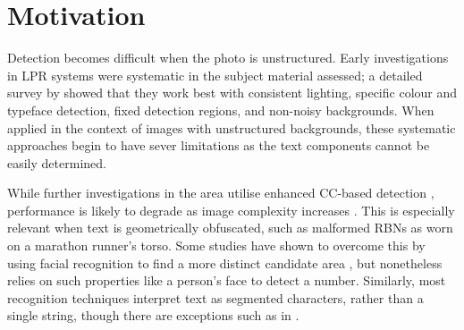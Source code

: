 \section{Motivation}
\label{sec:motivation}

Detection becomes difficult when the photo is unstructured. Early investigations in LPR systems were systematic in the subject material assessed; a detailed survey by \cite{Anagnostopoulos:2008vu} showed that they work best  with consistent lighting, specific colour and typeface detection, fixed detection regions, and non-noisy backgrounds. When applied in the context of images with unstructured backgrounds, these systematic approaches begin to have sever limitations as the text components cannot be easily determined.

While further investigations in the area utilise enhanced CC-based detection \citep{Chen:2011ul,Shivakumara:2011dl,Epshtein:2010tj}, performance is likely to degrade as image complexity increases \citep{Li:2012wd}. This is especially relevant when text is geometrically obfuscated, such as malformed RBNs as worn on a marathon runner's torso. Some studies have shown to overcome this by using facial recognition to find a more distinct candidate area \citep{Benami:2012jf}, but nonetheless relies on such properties like a person's face to detect a number. Similarly, most recognition techniques interpret text as segmented characters, rather than a single string, though there are exceptions such as in \cite{Zhu:2016ut}.